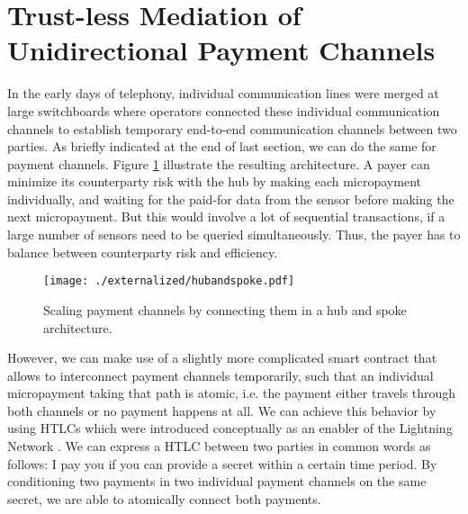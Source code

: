 \section{Trust-less Mediation of Unidirectional Payment Channels}
\label{sec:htlc}

In the early days of telephony, individual communication lines were merged at large switchboards where operators connected these individual communication channels to establish temporary end-to-end communication channels between two parties. As briefly indicated at the end of last section, we can do the same for payment channels. Figure \ref{fig:hubandspoke} illustrate the resulting architecture. A payer can minimize its counterparty risk with the hub by making each micropayment individually, and waiting for the paid-for data from the sensor before making the next micropayment. But this would involve a lot of sequential transactions, if a large number of sensors need to be queried simultaneously. Thus, the payer has to balance between counterparty risk and efficiency. 

\begin{figure}
\centering
\texttt{[image: ./externalized/hubandspoke.pdf]}
\caption{Scaling payment channels by connecting them in a hub and spoke architecture.}
\label{fig:hubandspoke}
\end{figure}

However, we can make use of a slightly more complicated smart contract that allows to interconnect payment channels temporarily, such that an individual micropayment taking that path is atomic, i.e. the payment either travels through both channels or no payment happens at all. We can achieve this behavior by using \ac{HTLC}s which were introduced conceptually as an enabler of the Lightning Network \parencite{poonbitcoin}. We can express a \ac{HTLC} between two parties in common words as follows: I pay you if you can provide a secret within a certain time period. By conditioning two payments in two individual payment channels on the same secret, we are able to atomically connect both payments. 


